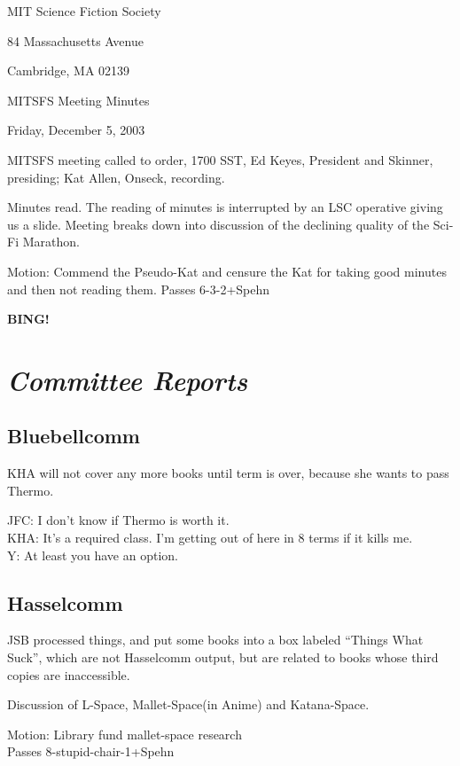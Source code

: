 \documentclass[10pt]{article}
\newcommand{\bing}{{\bf BING!} }
\newcommand{\goto}[1]{\bing \vskip 12pt \section*{{\em{#1}}}}
\begin{document}
\begin{center}

MIT Science Fiction Society 

84 Massachusetts Avenue

Cambridge, MA 02139

\vspace{12pt}

MITSFS Meeting Minutes 

Friday, December 5, 2003

\end{center}
 
\vspace{18pt}

\setlength{\parskip}{6pt}

\noindent
MITSFS meeting called to order, 1700 SST, Ed Keyes, President and
Skinner, presiding; Kat Allen,  Onseck, recording.

Minutes read.  The reading of minutes is interrupted by an LSC
operative giving us a slide.  Meeting breaks down into discussion of
the declining quality of the Sci-Fi Marathon.

Motion: Commend the Pseudo-Kat and censure the Kat for taking good
minutes and then not reading them.
Passes 6-3-2+Spehn

\goto{Committee Reports}
\subsection*{Bluebellcomm}
KHA will not cover any more books until term is over, because she
wants to pass Thermo. 

JFC: I don't know if Thermo is worth it.\\
KHA: It's a required class. I'm getting out of here in 8 terms if it
kills me.\\
Y: At least you have an option.

\subsection*{Hasselcomm}
JSB processed things, and put some books into a box labeled
``Things What Suck'', which are not Hasselcomm output, but are related
to books whose third copies are inaccessible.


Discussion of L-Space, Mallet-Space(in Anime) and Katana-Space.

Motion: Library fund mallet-space research\\
Passes 8-stupid-chair-1+Spehn
\end{document}
